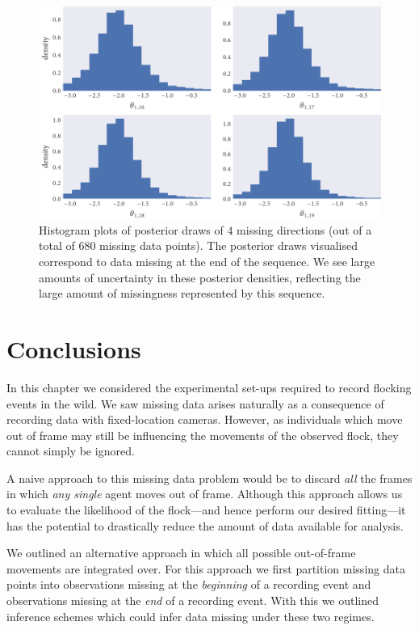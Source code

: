\begin{figure}[tb]
  \includegraphics{dir_hist.pdf}
  \caption{Histogram plots of posterior draws of $4$ missing directions (out of
    a total of $680$ missing data points). The posterior draws visualised
    correspond to data missing at the end of the sequence. We see large amounts
    of uncertainty in these posterior densities, reflecting the large amount of
    missingness represented by this sequence.}
  \label{fig:dir_hist}
\end{figure}

\section*{Conclusions}

In this chapter we considered the experimental set-ups required to record
flocking events in the wild. We saw missing data arises naturally as a
consequence of recording data with fixed-location cameras. However, as
individuals which move out of frame may still be influencing the movements
of the observed flock, they cannot simply be ignored.

A naive approach to this missing data problem would be to discard \emph{all}
the frames in which \emph{any single} agent moves out of frame. Although this
approach allows us to evaluate the likelihood of the flock---and hence perform
our desired fitting---it has the potential to drastically reduce the amount of
data available for analysis.

We outlined an alternative approach in which all possible out-of-frame
movements are integrated over. For this approach we first partition missing
data points into observations missing at the \emph{beginning} of a recording
event and observations missing at the \emph{end} of a recording event. With this
we outlined inference schemes which could infer data missing under these two
regimes.

